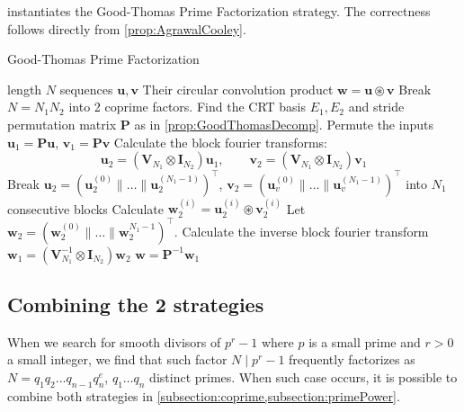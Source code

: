  instantiates the Good-Thomas Prime Factorization strategy. The correctness follows directly from \cref{prop:AgrawalCooley}.
\begin{algorithm}[h]
    \caption{Good-Thomas Prime Factorization}\label{alg:GoodThomas}
    \begin{algorithmic}[1]
         length \(N\) sequences \(\bm{u}, \bm{v}\)
        \Ensure Their circular convolution product \(\bm{w} = \bm{u} \circledast \bm{v}\)
        \State Break \(N = N_1 N_2\) into 2 coprime factors. Find the CRT basis \(E_1, E_2\) and stride permutation matrix \(\bm{P}\) as in \cref{prop:GoodThomasDecomp}.
        \State Permute the inputs \(\bm{u}_1 = \bm{P} \bm{u}\), \(\bm{v}_1 = \bm{P} \bm{v}\)
        \State Calculate the block fourier transforms:
        \[ \bm{u}_2 = \left(\bm{V}_{N_1} \otimes \bm{I}_{N_2}\right) \bm{u}_1, \qquad \bm{v}_2 = \left(\bm{V}_{N_1} \otimes \bm{I}_{N_2}\right) \bm{v}_1\] 
        \State Break \(\bm{u}_2 = (\bm{u}_2^{(0)} \parallel \ldots \parallel \bm{u}_2^{(N_1 - 1)})^{\top}\), \(\bm{v}_2 = (\bm{u}_v^{(0)} \parallel \ldots \parallel \bm{u}_v^{(N_1 - 1)})^{\top}\) into \(N_1\) consecutive blocks
            \State Calculate \(\bm{w}_2^{(i)} = \bm{u}_2^{(i)} \circledast \bm{v}_2^{(i)}\) 
        \EndFor
        \State Let \(\bm{w}_2 = (\bm{w}_2^{(0)} \parallel \ldots \parallel \bm{w}_2^{N_1 - 1})^{\top}\). Calculate the inverse block fourier transform \(\bm{w}_1 = \left(\bm{V}_{N_1}^{-1} \otimes \bm{I}_{N_2}\right) \bm{w}_2\)
         \(\bm{w} = \bm{P}^{-1} \bm{w}_1\)
    \end{algorithmic}
\end{algorithm}

\subsection{Combining the 2 strategies} \label{subsection:combination}
When we search for smooth divisors of \(p^r - 1\) where \(p\) is a small prime and \(r>0\) a small integer, we find that such factor \(N \mid p^r - 1\) frequently factorizes as \(N = q_1 q_2 \ldots q_{n-1} q_n^e\), \(q_1 \ldots q_n\) distinct primes. When such case occurs, it is possible to combine both strategies in \cref{subsection:coprime,subsection:primePower}. 

